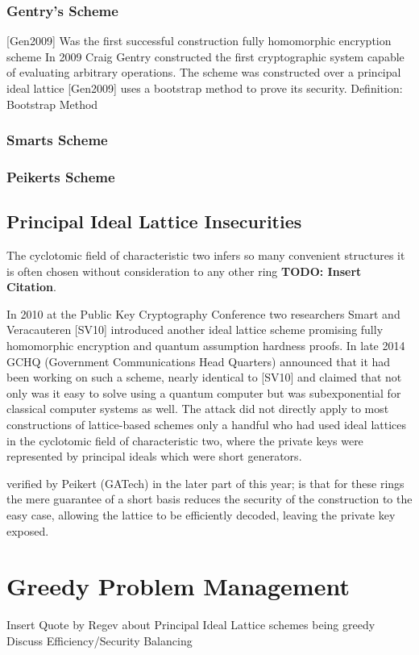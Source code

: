 \subsubsection{Gentry's Scheme}
[Gen2009] Was the first successful construction fully homomorphic encryption scheme In 2009 Craig Gentry constructed the first cryptographic system capable of evaluating arbitrary operations. The scheme was constructed over a principal ideal lattice [Gen2009] uses a bootstrap method to prove its security.
Definition: Bootstrap Method 

\subsubsection{Smarts Scheme}

\subsubsection{Peikerts Scheme}

\subsection{Principal Ideal Lattice Insecurities}

The cyclotomic field of characteristic two infers so many convenient
structures it is often chosen without consideration to any other ring \textbf{TODO: Insert Citation}.

In 2010 at the Public Key Cryptography Conference two researchers Smart and Veracauteren [SV10] introduced another ideal lattice scheme promising fully homomorphic encryption and quantum assumption hardness proofs. In late 2014 GCHQ (Government Communications Head Quarters) announced that it had been working on such a scheme, nearly identical to [SV10] and claimed that not only was it easy to solve using a quantum computer but was subexponential for classical computer systems as well. The attack did not directly apply to most constructions of lattice-based schemes only a handful who had used ideal lattices in the cyclotomic field of characteristic two, where the private keys were represented by principal ideals which were short generators. 

 verified by Peikert (GATech) in the later part of this year; is that for these rings the
mere guarantee of a short basis reduces the security of the construction to the easy case, allowing the lattice to be efficiently decoded, leaving the private key exposed.

\section{Greedy Problem Management}

Insert Quote by Regev about Principal Ideal Lattice schemes being greedy 
Discuss Efficiency/Security Balancing

